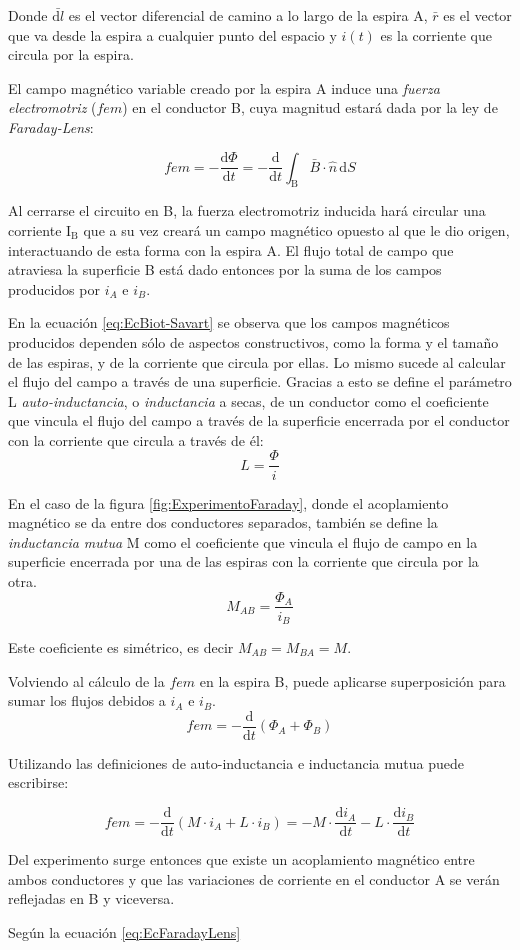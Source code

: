 Donde \(\bar{\mathrm{d}l}\) es el vector diferencial de camino a lo largo de la espira A, \(\bar{r}\) es el vector que va desde la espira a cualquier punto del espacio y \(i(t)\) es la corriente que circula por la espira.

El campo magnético variable creado por la espira A induce una \emph{fuerza electromotriz} (\(fem\)) en el conductor B, cuya magnitud estará dada por la ley de \emph{Faraday-Lens}:

\begin{equation}
	\label{eq:EcFaradayLens}
	fem = - \frac{\mathrm{d}\Phi}{\mathrm{d}t} = - \frac{\mathrm{d}}{\mathrm{d}t} \int_\mathrm{B} \bar{B} \cdot \hat{n} \, \mathrm{d}S
\end{equation}

Al cerrarse el circuito en B, la fuerza electromotriz inducida hará circular una corriente \(\mathrm{I}_\mathrm{B}\) que a su vez creará un campo magnético opuesto al que le dio origen, interactuando de esta forma con la espira A. El flujo total de campo que atraviesa la superficie B está dado entonces por la suma de los campos producidos por \(i_A\) e \(i_B\).

En la ecuación \ref{eq:EcBiot-Savart} se observa que los campos magnéticos producidos dependen sólo de aspectos constructivos, como la forma y el tamaño de las espiras, y de la corriente que circula por ellas. Lo mismo sucede al calcular el flujo del campo a través de una superficie. Gracias a esto se define el parámetro L \emph{auto-inductancia}, o \emph{inductancia} a secas, de un conductor como el coeficiente que vincula el flujo del campo a través de la superficie encerrada por el conductor con la corriente que circula a través de él:
\[ L = \frac{\Phi}{i} \]

En el caso de la figura \ref{fig:ExperimentoFaraday}, donde el acoplamiento magnético se da entre dos conductores separados, también se define la \emph{inductancia mutua} M como el coeficiente que vincula el flujo de campo en la superficie encerrada por una de las espiras con la corriente que circula por la otra.
\[ M_{AB} = \frac{\Phi_A}{i_B} \]

Este coeficiente es simétrico, es decir \(M_{AB} = M_{BA} = M\).

Volviendo al cálculo de la \(fem\) en la espira B, puede aplicarse superposición para sumar los flujos debidos a \(i_A\) e \(i_B\). 
\[ fem = - \frac{\mathrm{d}}{\mathrm{d}t} \left( \Phi_{A} + \Phi_{B} \right)
\]

Utilizando las definiciones de auto-inductancia e inductancia mutua puede escribirse:

\[ fem = - \frac{\mathrm{d}}{\mathrm{d}t} \left( M \cdot i_A + L \cdot i_B \right) = -M \cdot \frac{\mathrm{d}i_A}{\mathrm{d}t} - L \cdot \frac{\mathrm{d}i_B}{\mathrm{d}t}
\]

Del experimento surge entonces que existe un acoplamiento magnético entre ambos conductores y que las variaciones de corriente en el conductor A se verán reflejadas en B y viceversa.


Según la ecuación \ref{eq:EcFaradayLens}


